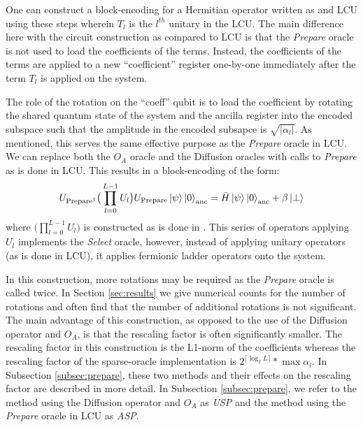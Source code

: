 One can construct a block-encoding for a Hermitian operator written as and LCU using these steps wherein $T_l$ is the $l^{th}$ unitary in the LCU.
The main difference here with the circuit construction as compared to LCU is that the \textit{Prepare} oracle is not used to load the coefficients of the terms.
Instead, the coefficients of the terms are applied to a new ``coefficient'' register one-by-one immediately after the term $T_l$ is applied on the system.

The role of the rotation on the ``coeff'' qubit is to load the coefficient by rotating the shared quantum state of the system and the ancilla register into the encoded subspace such that the amplitude in the encoded subsapce is $\sqrt{| \alpha_l |}$.
As mentioned, this serves the same effective purpose as the \textit{Prepare} oracle in LCU.
We can replace both the $O_A$ oracle and the Diffusion oracles with calls to \textit{Prepare} as is done in LCU.
This results in a block-encoding of the form:
\begin{equation}
    U_{\text{Prepare}^\dagger} \big( \prod_{l=0}^{L-1} U_l \big) U_{\text{Prepare}} \ket{\psi} \ket{0}_{\text{anc}} = \bar{H} \ket{\psi} \ket{0}_{\text{anc}} + \beta \ket{\perp}
\end{equation}
where $\big( \prod_{l=0}^{L-1} U_l \big)$ is constructed as is done in \cite{camps2024explicit,liu2024efficient}.
This series of operators applying $U_l$ implements the \textit{Select} oracle, however, instead of applying unitary operators (as is done in LCU), it applies fermionic ladder operators onto the system.

In this construction, more rotations may be required as the \textit{Prepare} oracle is called twice.
In Section \ref{sec:results} we give numerical counts for the number of rotations and often find that the number of additional rotations is not significant.
The main advantage of this construction, as opposed to the use of the Diffusion operator and $O_A$, is that the rescaling factor is often significantly smaller.
The rescaling factor in this construction is the L1-norm of the coefficients whereas the rescaling factor of the sparse-oracle implementation is $2^{\lceil \log_2{L} \rceil} * \max{\alpha_l}$.
In Subsection \ref{subsec:prepare}, these two methods and their effects on the rescaling factor are described in more detail.
In Subsection \ref{subsec:prepare}, we refer to the method using the Diffusion operator and $O_A$ as \textit{USP} and the method using the \textit{Prepare} oracle in LCU as \textit{ASP}.
